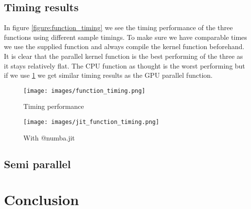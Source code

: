 \newpage

\subsection{Timing results}
\label{subsec:timing results}

In figure \ref{figure:function_timing} we see the timing performance of the three functions using different sample timings. To make sure we have comparable times we use the supplied  function and always compile the kernel function beforehand. It is clear that the parallel kernel function is the best performing of the three as it stays relatively flat.
The CPU function as thought is the worst performing but if we use  \ref{figure:jit_function_timing} we get similar timing results as the GPU parallel function.

\begin{figure}[!htb]
    \centering
    \begin{minipage}[t]{0.45\linewidth}
        \texttt{[image: images/function\_timing.png]}
        \caption{Timing performance}
        \label{figure:function_timing}
    \end{minipage}
    \begin{minipage}[t]{0.45\linewidth}
        \texttt{[image: images/jit\_function\_timing.png]}
        \caption{With @numba.jit}
        \label{figure:jit_function_timing}
    \end{minipage}
\end{figure}

\subsection{Semi parallel}
\label{subsec:semiparallel}

\section{Conclusion}
\label{sec:conclusion}

